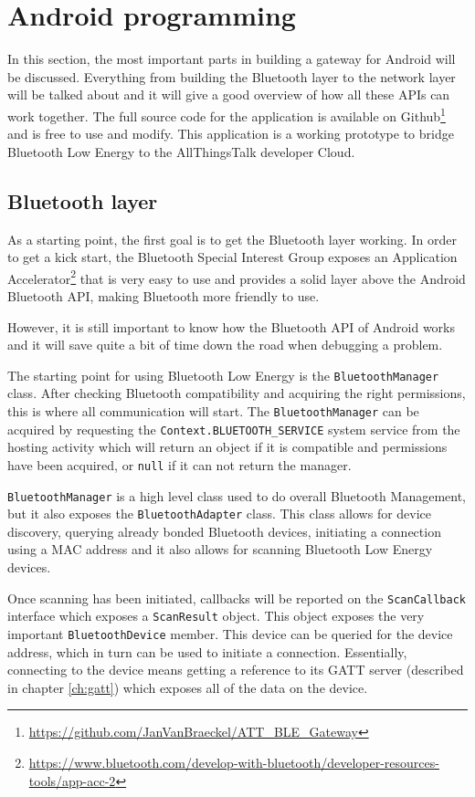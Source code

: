 \documentclass[pdftex,a4paper,12pt,twoside]{report}
\begin{document}
\section{Android programming}
\label{sec:androidprogramming}
In this section, the most important parts in building a gateway for Android will be discussed. Everything from building the Bluetooth layer to the network layer will be talked about and it will give a good overview of how all these APIs can work together. The full source code for the application is available on Github\footnote{\url{https://github.com/JanVanBraeckel/ATT_BLE_Gateway}} and is free to use and modify. This application is a working prototype to bridge Bluetooth Low Energy to the AllThingsTalk developer Cloud.

\subsection{Bluetooth layer}
\label{subsec:bluetoothlayer}
As a starting point, the first goal is to get the Bluetooth layer working. In order to get a kick start, the Bluetooth Special Interest Group exposes an Application Accelerator\footnote{\url{https://www.bluetooth.com/develop-with-bluetooth/developer-resources-tools/app-acc-2}} that is very easy to use and provides a solid layer above the Android Bluetooth API, making Bluetooth more friendly to use.

However, it is still important to know how the Bluetooth API of Android works and it will save quite a bit of time down the road when debugging a problem.

The starting point for using Bluetooth Low Energy is the \texttt{BluetoothManager} class. After checking Bluetooth compatibility and acquiring the right permissions, this is where all communication will start. The \texttt{BluetoothManager} can be acquired by requesting the \texttt{Context.BLUETOOTH\_SERVICE} system service from the hosting activity which will return an object if it is compatible and permissions have been acquired, or \texttt{null} if it can not return the manager.

\texttt{BluetoothManager} is a high level class used to do overall Bluetooth Management, but it also exposes the \texttt{BluetoothAdapter} class. This class allows for device discovery, querying already bonded Bluetooth devices, initiating a connection using a MAC address and it also allows for scanning Bluetooth Low Energy devices.

Once scanning has been initiated, callbacks will be reported on the \texttt{ScanCallback} interface which exposes a \texttt{ScanResult} object. This object exposes the very important \texttt{BluetoothDevice} member. This device can be queried for the device address, which in turn can be used to initiate a connection. Essentially, connecting to the device means getting a reference to its GATT server (described in chapter \ref{ch:gatt}) which exposes all of the data on the device.
\end{document}
